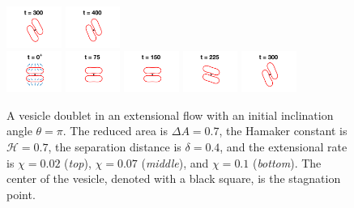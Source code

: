 \documentclass[prf,superscriptaddress,showkeys]{revtex4-1}
\begin{document}
\begin{figure}[htp]
  \includegraphics[width = 0.16\textwidth,trim={4cm 2cm 4cm 1cm},clip]{figs/extensional_adR4em1adS7em1Chi7em2_ra070_image04.png}
  \includegraphics[width = 0.16\textwidth,trim={4cm 2cm 4cm 1cm},clip]{figs/extensional_adR4em1adS7em1Chi7em2_ra070_image05.png} \\
  \includegraphics[width = 0.16\textwidth,trim={4cm 2cm 4cm 1cm},clip]{figs/extensional_adR4em1adS7em1Chi1em1_ra070_image01.png}
  \includegraphics[width = 0.16\textwidth,trim={4cm 2cm 4cm 1cm},clip]{figs/extensional_adR4em1adS7em1Chi1em1_ra070_image02.png}
  \includegraphics[width = 0.16\textwidth,trim={4cm 2cm 4cm 1cm},clip]{figs/extensional_adR4em1adS7em1Chi1em1_ra070_image03.png}
  \includegraphics[width = 0.16\textwidth,trim={4cm 2cm 4cm 1cm},clip]{figs/extensional_adR4em1adS7em1Chi1em1_ra070_image04.png}
  \includegraphics[width = 0.16\textwidth,trim={4cm 2cm 4cm 1cm},clip]{figs/extensional_adR4em1adS7em1Chi1em1_ra070_image05.png}
  \caption{\label{fig:extensional1} A vesicle doublet in an extensional
  flow with an initial inclination angle $\theta=\pi$.  The reduced
  area is $\Delta A = 0.7$, the Hamaker constant is $\mathcal{H} = 0.7$,
  the separation distance is $\delta = 0.4$, and the extensional rate is
  $\chi = 0.02$ ({\em top}), $\chi=0.07$ ({\em middle}), and $\chi =
  0.1$ ({\em bottom}).  The center of the vesicle, denoted with a black
  square, is the stagnation point.}
  \end{figure}
\end{document}
